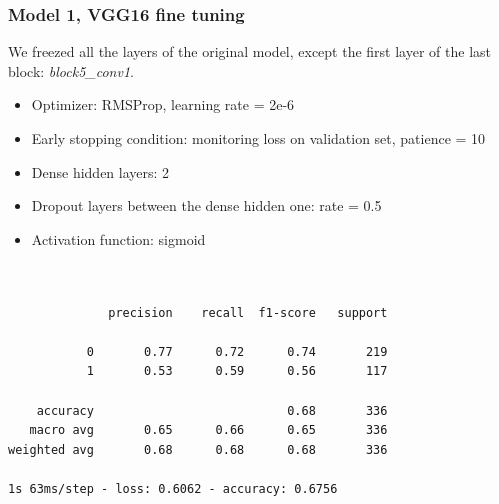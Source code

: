 \documentclass{article}
\begin{document}
\subsubsection{Model 1, VGG16 fine tuning}
We freezed all the layers of the original model, except the first layer of the last block: \textit{block5\_conv1}.

\begin{itemize}
\item Optimizer: RMSProp, learning rate = 2e-6
\item Early stopping condition: monitoring loss on validation set, patience = 10
\item Dense hidden layers: 2
\item Dropout layers between the dense hidden one: rate = 0.5
\item Activation function: sigmoid
\end{itemize}

\begin{verbatim}


              precision    recall  f1-score   support

           0       0.77      0.72      0.74       219
           1       0.53      0.59      0.56       117

    accuracy                           0.68       336
   macro avg       0.65      0.66      0.65       336
weighted avg       0.68      0.68      0.68       336

1s 63ms/step - loss: 0.6062 - accuracy: 0.6756

\end{verbatim}
\end{document}

